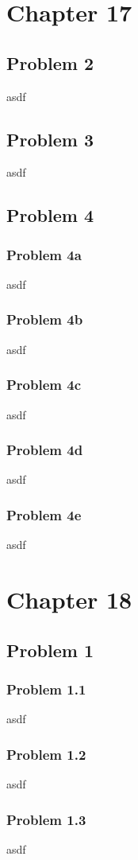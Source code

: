 \documentclass{article}
\begin{document}
\newpage
\section{\textbf{Chapter 17}}
\subsection{Problem 2}
asdf


\subsection{Problem 3}
asdf


\subsection{Problem 4}
\subsubsection{Problem 4a}
asdf

\subsubsection{Problem 4b}
asdf

\subsubsection{Problem 4c}
asdf

\subsubsection{Problem 4d}
asdf

\subsubsection{Problem 4e}
asdf


\newpage
\section{\textbf{Chapter 18}}
\subsection{Problem 1}
\subsubsection{Problem 1.1}
asdf


\subsubsection{Problem 1.2}
asdf


\subsubsection{Problem 1.3}
asdf
\end{document}
